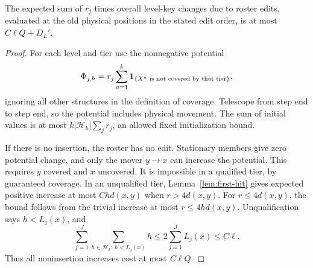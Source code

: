 \begin{lemma}\label{lem:tier-edits}
The expected sum of \(r_j\) times overall level-key changes due to
roster edits, evaluated at the old physical positions in the stated edit
order, is at most \(C\ell Q+D_L'\).
\end{lemma}
\begin{proof}
For each level and tier use the nonnegative potential
\[
 \Phi_{j,h}=r_j\sum_{a=1}^k
 \mathbf 1_{\{X^a\text{ is not covered by that tier}\}},
\]
ignoring all other structures in the definition of coverage.  Telescope
from step end to step end, so the potential includes physical movement.
The sum of initial values is at most
\(k|\mathcal H_k|\sum_jr_j\), an allowed fixed initialization bound.

If there is no insertion, the roster has no edit.  Stationary members
give zero potential change, and only the mover \(y\to x\) can increase
the potential.  This requires \(y\) covered and \(x\) uncovered.  It
is impossible in a qualified tier, by guaranteed coverage.  In an
unqualified tier, Lemma~\ref{lem:first-hit} gives expected positive
increase at most \(Chd(x,y)\) when \(r>4d(x,y)\).  For
\(r\le4d(x,y)\), the bound follows from the trivial increase at most
\(r\le4h d(x,y)\).  Unqualification says \(h<L_j(x)\), and
\begin{equation}\label{eq:unqualified-tier-sum}
 \sum_{j=1}^J\sum_{h\in\mathcal H_k:\,h<L_j(x)}h
 \le2\sum_{j=1}^J L_j(x)\le C\ell.
\end{equation}
Thus all noninsertion increases cost at most \(C\ell Q\).


\end{proof}
